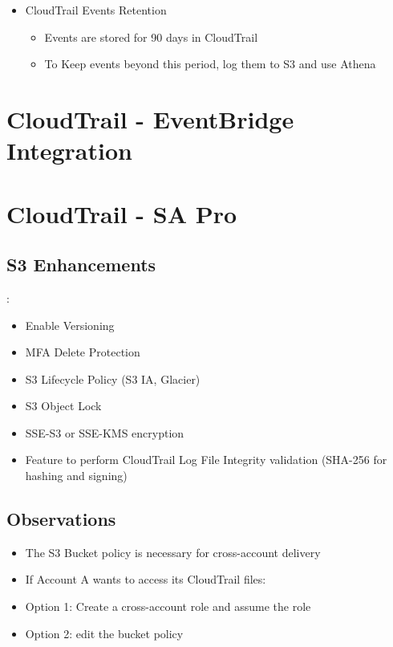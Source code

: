 \begin{itemize}

    \item CloudTrail Events Retention
    \begin{itemize}
        \item Events are stored for 90 days in CloudTrail
        \item To Keep events beyond this period, log them to S3 and use Athena
    \end{itemize}
\end{itemize}



\section{CloudTrail - EventBridge Integration}



\section{CloudTrail - SA Pro}

\subsection{S3 Enhancements}:
\begin{itemize}
    \item Enable Versioning
    \item MFA Delete Protection
    \item S3 Lifecycle Policy (S3 IA, Glacier)
    \item S3 Object Lock
    \item SSE-S3 or SSE-KMS encryption
    \item Feature to perform CloudTrail Log File Integrity validation (SHA-256 for hashing and signing)
\end{itemize}


\subsection{Observations}
\begin{itemize}
    \item The S3 Bucket policy is necessary for cross-account delivery
    \item If Account A wants to access its CloudTrail files:
    \item Option 1: Create a cross-account role and assume the role
    \item Option 2: edit the bucket policy
\end{itemize}

